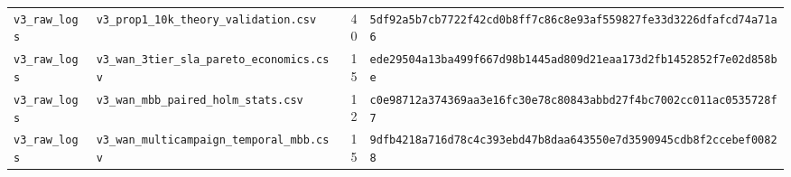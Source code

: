 \documentclass[10pt,journal,compsoc]{IEEEtran}
\begin{document}
\begin{table}[!htbp]
\begin{tabular}{@{}llrl@{}}
\texttt{v3\_raw\_logs} & \texttt{v3\_prop1\_10k\_theory\_validation.csv} & 40 & \texttt{5df92a5b7cb7722f42cd0b8ff7c86c8e93af559827fe33d3226dfafcd74a71a6} \\
\texttt{v3\_raw\_logs} & \texttt{v3\_wan\_3tier\_sla\_pareto\_economics.csv} & 15 & \texttt{ede29504a13ba499f667d98b1445ad809d21eaa173d2fb1452852f7e02d858be} \\
\texttt{v3\_raw\_logs} & \texttt{v3\_wan\_mbb\_paired\_holm\_stats.csv} & 12 & \texttt{c0e98712a374369aa3e16fc30e78c80843abbd27f4bc7002cc011ac0535728f7} \\
\texttt{v3\_raw\_logs} & \texttt{v3\_wan\_multicampaign\_temporal\_mbb.csv} & 15 & \texttt{9dfb4218a716d78c4c393ebd47b8daa643550e7d3590945cdb8f2ccebef00828} \\
\bottomrule\end{tabular}\end{table}
\end{document}
